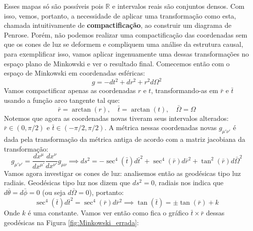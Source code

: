 Esses mapas só são possíveis pois $\mathbb{R}$ e intervalos reais são conjuntos densos. Com isso, vemos, portanto, a necessidade de aplicar uma transformação como esta, chamada intuitivamente de \textbf{compactificação}, ao construir um diagrama de Penrose. Porém, não podemos realizar uma compactificação das coordenadas sem que os cones de luz se deformem e compliquem uma análise da estrutura causal, para exemplificar isso, vamos aplicar ingenuamente uma dessas transformações no espaço plano de Minkowski e ver o resultado final. Comecemos então com o espaço de Minkowski em coordenadas esféricas:
\[g = -dt^2+dr^2+r^2d\Omega^2\]
Vamos compactificar apenas as coordenadas $r$ e $t$, transformando-as em $\bar{r}$ e $\bar{t}$ usando a função arco tangente tal que:
\[\bar{r}=\arctan(r),\quad\bar{t}=\arctan(t),\quad\bar{\Omega}=\Omega\]
Notemos que agora as coordenadas novas tiveram seus intervalos alterados: $\bar{r}\in(0,\pi/2)$ e $\bar{t}\in(-\pi/2,\pi/2)$. A métrica nessas coordenadas novas $g_{\mu'\!\nu'}$ é dada pela transformação da métrica antiga de acordo com a matriz jacobiana da transformação:
\[g_{\mu'\!\nu'}=\frac{dx^\mu}{dx^{\mu'}}\frac{dx^\nu}{dx^{\nu'}}g_{\mu\nu}\implies ds^2=-\sec^4(\bar{t})d\bar{t}^2+\sec^4(\bar{r})d\bar{r}^2 + \tan^2(\bar{r})d\bar{\Omega}^2\]
Vamos agora investigar os cones de luz: analisemos então as geodésicas tipo luz radiais. Geodésicas tipo luz nos dizem que $ds^2=0$, radiais nos indica que $d\bar{\theta}=d\bar{\phi}=0$ (ou seja $d\bar{\Omega}=0$), portanto:
\begin{equation}\sec^4(\bar{t})d\bar{t}^2=\sec^4(\bar{r})d\bar{r}^2\implies\tan(\bar{t})=\pm\tan(\bar{r})+k
\label{eq:geodesica_compact_errada}
\end{equation}
Onde $k$ é uma constante. Vamos ver então como fica o gráfico $\bar{t}\times\bar{r}$ dessas geodésicas na Figura \ref{fig:Minkowski_errada}:

